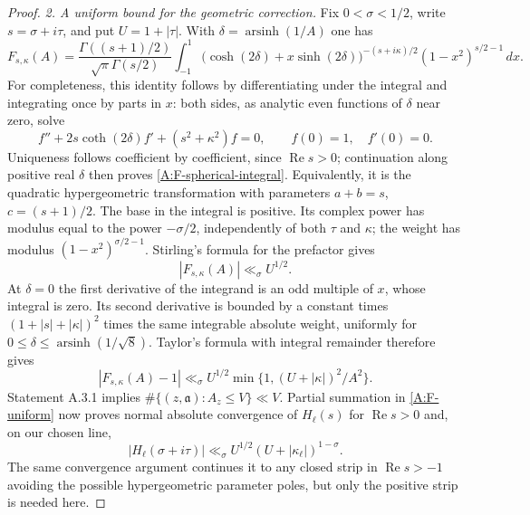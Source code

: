 \begin{proof}
\emph{2. A uniform bound for the geometric correction.}
Fix $0<\sigma<1/2$, write $s=\sigma+i\tau$, and put
$U=1+|\tau|$. With $\delta=\operatorname{arsinh}(1/A)$ one has
\begin{equation}\label{A:F-spherical-integral}
 F_{s,\kappa}(A)=
 \frac{\Gamma((s+1)/2)}{\sqrt\pi\Gamma(s/2)}
 \int_{-1}^1
 \bigl(\cosh(2\delta)+x\sinh(2\delta)\bigr)^{-(s+i\kappa)/2}
 (1-x^2)^{s/2-1}\,dx.
\end{equation}
For completeness, this identity follows by differentiating under
the integral and integrating once by parts in $x$: both sides,
as analytic even functions of $\delta$ near zero, solve
\[
 f''+2s\coth(2\delta)f'+(s^2+\kappa^2)f=0,
 \qquad f(0)=1,\quad f'(0)=0.
\]
Uniqueness follows coefficient by coefficient, since
$\operatorname{Re}s>0$; continuation along positive real $\delta$
then proves \eqref{A:F-spherical-integral}. Equivalently, it is
the quadratic hypergeometric transformation with parameters
$a+b=s$, $c=(s+1)/2$.
The base in the integral is positive. Its complex power has modulus
equal to the power $-\sigma/2$, independently of both $\tau$ and
$\kappa$; the weight has modulus $(1-x^2)^{\sigma/2-1}$.
Stirling's formula for the prefactor gives
\[
 |F_{s,\kappa}(A)|\ll_\sigma U^{1/2}.
\]
At $\delta=0$ the first derivative of the integrand is an odd
multiple of $x$, whose integral is zero. Its second derivative is
bounded by a constant times $(1+|s|+|\kappa|)^2$ times the same
integrable absolute weight, uniformly for
$0\leq\delta\leq\operatorname{arsinh}(1/\sqrt8)$.
Taylor's formula with integral remainder therefore gives
\begin{equation}\label{A:F-uniform}
 |F_{s,\kappa}(A)-1|
 \ll_\sigma U^{1/2}
       \min\{1,(U+|\kappa|)^2/A^2\}.
\end{equation}
Statement A.3.1 implies
$\#\{(z,\mathfrak a):A_z\leq V\}\ll V$.
Partial summation in \eqref{A:F-uniform} now proves normal
absolute convergence of $H_\ell(s)$ for $\operatorname{Re}s>0$
and, on our chosen line,
\begin{equation}\label{A:H-uniform}
 |H_\ell(\sigma+i\tau)|
       \ll_\sigma U^{1/2}(U+|\kappa_\ell|)^{1-\sigma}.
\end{equation}
The same convergence argument continues it to any closed strip
in $\operatorname{Re}s>-1$ avoiding the possible hypergeometric
parameter poles, but only the positive strip is needed here.


\end{proof}

